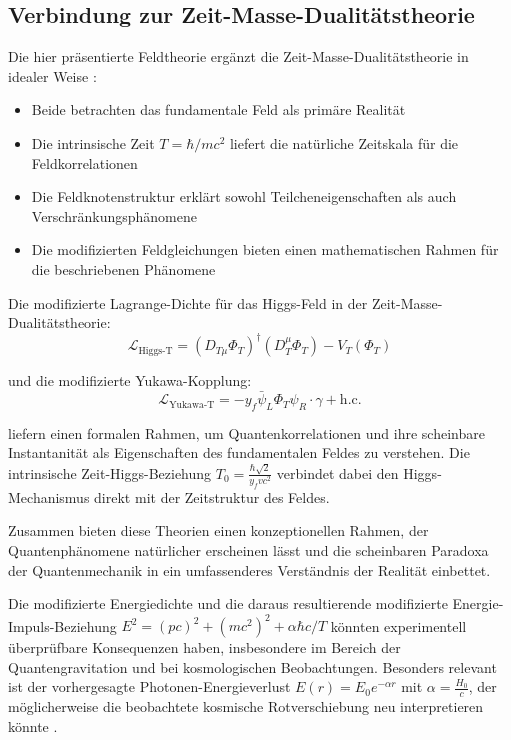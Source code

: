\documentclass[a4paper,12pt]{article}
\begin{document}
	\subsection{Verbindung zur Zeit-Masse-Dualitätstheorie}
	Die hier präsentierte Feldtheorie ergänzt die Zeit-Masse-Dualitätstheorie in idealer Weise \cite{Pascher2024}:
	\begin{itemize}
		\item Beide betrachten das fundamentale Feld als primäre Realität
		\item Die intrinsische Zeit $T = \hbar/mc^2$ liefert die natürliche Zeitskala für die Feldkorrelationen
		\item Die Feldknotenstruktur erklärt sowohl Teilcheneigenschaften als auch Verschränkungsphänomene
		\item Die modifizierten Feldgleichungen bieten einen mathematischen Rahmen für die beschriebenen Phänomene
	\end{itemize}
	
	Die modifizierte Lagrange-Dichte für das Higgs-Feld in der Zeit-Masse-Dualitätstheorie:
	\begin{equation}
		\mathcal{L}_{\text{Higgs-T}} = (D_{T\mu} \Phi_T)^\dagger (D_T^\mu \Phi_T) - V_T(\Phi_T)
	\end{equation}
	
	und die modifizierte Yukawa-Kopplung:
	\begin{equation}
		\mathcal{L}_{\text{Yukawa-T}} = -y_f \bar{\psi}_L \Phi_T \psi_R \cdot \gamma + \text{h.c.}
	\end{equation}
	
	liefern einen formalen Rahmen, um Quantenkorrelationen und ihre scheinbare Instantanität als Eigenschaften des fundamentalen Feldes zu verstehen. Die intrinsische Zeit-Higgs-Beziehung $T_0 = \frac{\hbar \sqrt{2}}{y_f v c^2}$ verbindet dabei den Higgs-Mechanismus direkt mit der Zeitstruktur des Feldes.
	
	Zusammen bieten diese Theorien einen konzeptionellen Rahmen, der Quantenphänomene natürlicher erscheinen lässt und die scheinbaren Paradoxa der Quantenmechanik in ein umfassenderes Verständnis der Realität einbettet.
	
	Die modifizierte Energiedichte und die daraus resultierende modifizierte Energie-Impuls-Beziehung $E^2 = (pc)^2 + (mc^2)^2 + \alpha\hbar c/T$ könnten experimentell überprüfbare Konsequenzen haben, insbesondere im Bereich der Quantengravitation und bei kosmologischen Beobachtungen. Besonders relevant ist der vorhergesagte Photonen-Energieverlust $E(r) = E_0 e^{-\alpha r}$ mit $\alpha = \frac{H_0}{c}$, der möglicherweise die beobachtete kosmische Rotverschiebung neu interpretieren könnte \cite{Pascher2024}.
	
\end{document}
